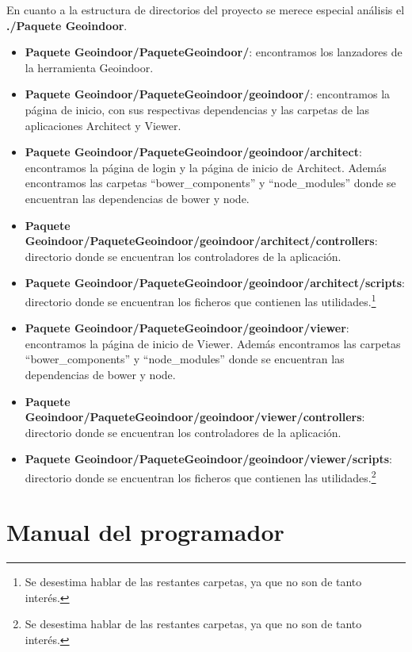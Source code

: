 En cuanto a la estructura de directorios del proyecto se merece especial análisis el \textbf{./Paquete Geoindoor}.

\begin{itemize}
	\item \textbf{Paquete Geoindoor/PaqueteGeoindoor/}: encontramos los lanzadores de la herramienta Geoindoor.
	\item \textbf{Paquete Geoindoor/PaqueteGeoindoor/geoindoor/}: encontramos la página de inicio, con sus respectivas dependencias y las carpetas de las aplicaciones Architect y Viewer.
	\item \textbf{Paquete Geoindoor/PaqueteGeoindoor/geoindoor/architect}: encontramos la página de login y la página de inicio de Architect. Además encontramos las carpetas ``bower\_components'' y ``node\_modules'' donde se encuentran las dependencias de bower y node.
	\item \textbf{Paquete Geoindoor/PaqueteGeoindoor/geoindoor/architect/controllers}: directorio donde se encuentran los controladores de la aplicación.
	\item \textbf{Paquete Geoindoor/PaqueteGeoindoor/geoindoor/architect/scripts}: directorio donde se encuentran los ficheros que contienen las utilidades.\footnote{Se desestima hablar de las restantes carpetas, ya que no son de tanto interés.}
	
	\item \textbf{Paquete Geoindoor/PaqueteGeoindoor/geoindoor/viewer}: encontramos la página de inicio de Viewer. Además encontramos las carpetas ``bower\_components'' y ``node\_modules'' donde se encuentran las dependencias de bower y node.
	\item \textbf{Paquete Geoindoor/PaqueteGeoindoor/geoindoor/viewer/controllers}: directorio donde se encuentran los controladores de la aplicación.
	\item \textbf{Paquete Geoindoor/PaqueteGeoindoor/geoindoor/viewer/scripts}: directorio donde se encuentran los ficheros que contienen las utilidades.\footnote{Se desestima hablar de las restantes carpetas, ya que no son de tanto interés.}
\end{itemize}


\section{Manual del programador}

